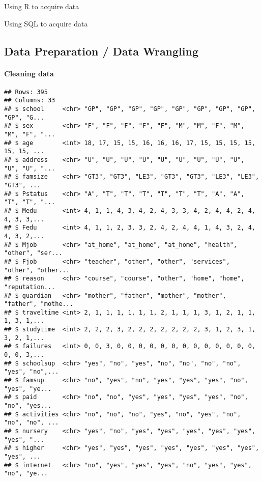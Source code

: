 \documentclass[
]{article}
\begin{document}
Using R to acquire data

Using SQL to acquire data

\hypertarget{data-preparation-data-wrangling}{%
\subsection{Data Preparation / Data
Wrangling}\label{data-preparation-data-wrangling}}

\hypertarget{cleaning-data}{%
\paragraph{Cleaning data}\label{cleaning-data}}

\begin{verbatim}
## Rows: 395
## Columns: 33
## $ school     <chr> "GP", "GP", "GP", "GP", "GP", "GP", "GP", "GP", "GP", "G...
## $ sex        <chr> "F", "F", "F", "F", "F", "M", "M", "F", "M", "M", "F", "...
## $ age        <int> 18, 17, 15, 15, 16, 16, 16, 17, 15, 15, 15, 15, 15, 15, ...
## $ address    <chr> "U", "U", "U", "U", "U", "U", "U", "U", "U", "U", "U", "...
## $ famsize    <chr> "GT3", "GT3", "LE3", "GT3", "GT3", "LE3", "LE3", "GT3", ...
## $ Pstatus    <chr> "A", "T", "T", "T", "T", "T", "T", "A", "A", "T", "T", "...
## $ Medu       <int> 4, 1, 1, 4, 3, 4, 2, 4, 3, 3, 4, 2, 4, 4, 2, 4, 4, 3, 3,...
## $ Fedu       <int> 4, 1, 1, 2, 3, 3, 2, 4, 2, 4, 4, 1, 4, 3, 2, 4, 4, 3, 2,...
## $ Mjob       <chr> "at_home", "at_home", "at_home", "health", "other", "ser...
## $ Fjob       <chr> "teacher", "other", "other", "services", "other", "other...
## $ reason     <chr> "course", "course", "other", "home", "home", "reputation...
## $ guardian   <chr> "mother", "father", "mother", "mother", "father", "mothe...
## $ traveltime <int> 2, 1, 1, 1, 1, 1, 1, 2, 1, 1, 1, 3, 1, 2, 1, 1, 1, 3, 1,...
## $ studytime  <int> 2, 2, 2, 3, 2, 2, 2, 2, 2, 2, 2, 3, 1, 2, 3, 1, 3, 2, 1,...
## $ failures   <int> 0, 0, 3, 0, 0, 0, 0, 0, 0, 0, 0, 0, 0, 0, 0, 0, 0, 0, 3,...
## $ schoolsup  <chr> "yes", "no", "yes", "no", "no", "no", "no", "yes", "no",...
## $ famsup     <chr> "no", "yes", "no", "yes", "yes", "yes", "no", "yes", "ye...
## $ paid       <chr> "no", "no", "yes", "yes", "yes", "yes", "no", "no", "yes...
## $ activities <chr> "no", "no", "no", "yes", "no", "yes", "no", "no", "no", ...
## $ nursery    <chr> "yes", "no", "yes", "yes", "yes", "yes", "yes", "yes", "...
## $ higher     <chr> "yes", "yes", "yes", "yes", "yes", "yes", "yes", "yes", ...
## $ internet   <chr> "no", "yes", "yes", "yes", "no", "yes", "yes", "no", "ye...

\end{verbatim}
\end{document}
